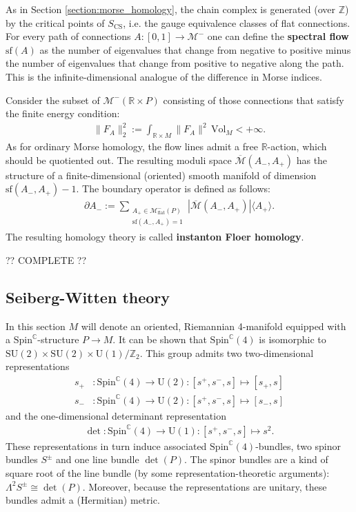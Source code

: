     As in Section \ref{section:morse_homology}, the chain complex is generated (over $\mathbb{Z}$) by the critical points of $S_\mathrm{CS}$, i.e. the gauge equivalence classes of flat connections. For every path of connections $A:[0,1]\rightarrow\mathcal{M}^-$ one can define the \textbf{spectral flow} $\mathrm{sf}(A)$ as the number of eigenvalues that change from negative to positive minus the number of eigenvalues that change from positive to negative along the path. This is the infinite-dimensional analogue of the difference in Morse indices.

    Consider the subset of $\mathcal{M}^-(\mathbb{R}\times P)$ consisting of those connections that satisfy the finite energy condition:
    \begin{gather}
        \|F_A\|^2_2 := \int_{\mathbb{R}\times M}\|F_A\|^2\,\mathrm{Vol}_M<+\infty.
    \end{gather}
    As for ordinary Morse homology, the flow lines admit a free $\mathbb{R}$-action, which should be quotiented out. The resulting moduli space $\overline{\mathcal{M}}(A_-,A_+)$ has the structure of a finite-dimensional (oriented) smooth manifold of dimension $\mathrm{sf}(A_-,A_+)-1$. The boundary operator is defined as follows:
    \begin{gather}
        \partial A_- := \sum_{\substack{A_+\in\mathcal{M}^-_\mathrm{flat}(P)\\\mathrm{sf}(A_-,A_+)=1}}\left|\overline{\mathcal{M}}(A_-,A_+)\right|\langle A_+ \rangle.
    \end{gather}
    The resulting homology theory is called \textbf{instanton Floer homology}.

    ?? COMPLETE ??

\subsection{Seiberg-Witten theory}

    In this section $M$ will denote an oriented, Riemannian 4-manifold equipped with a $\mathrm{Spin}^\mathbb{C}$-structure $P\rightarrow M$. It can be shown that $\mathrm{Spin}^\mathbb{C}(4)$ is isomorphic to $\mathrm{SU}(2)\times\mathrm{SU}(2)\times\mathrm{U}(1)/\mathbb{Z}_2$. This group admits two two-dimensional representations
    \begin{align}
        s_+&:\mathrm{Spin}^\mathbb{C}(4)\rightarrow\mathrm{U}(2):[s^+,s^-,s]\mapsto[s_+,s]\\
        s_-&:\mathrm{Spin}^\mathbb{C}(4)\rightarrow\mathrm{U}(2):[s^+,s^-,s]\mapsto[s_-,s]
    \end{align}
    and the one-dimensional determinant representation
    \begin{gather}
        \det:\mathrm{Spin}^\mathbb{C}(4)\rightarrow\mathrm{U}(1):[s^+,s^-,s]\mapsto s^2.
    \end{gather}
    These representations in turn induce associated $\mathrm{Spin}^\mathbb{C}(4)$-bundles, two spinor bundles $S^\pm$ and one line bundle $\det(P)$. The spinor bundles are a kind of square root of the line bundle (by some representation-theoretic arguments): $\Lambda^2S^\pm\cong\det(P)$. Moreover, because the representations are unitary, these bundles admit a (Hermitian) metric.

